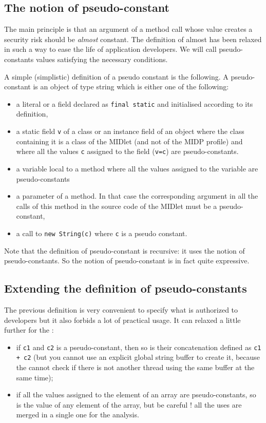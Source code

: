 \subsection{The notion of pseudo-constant}
The main principle is that an argument of a method call whose value creates
a security risk should be \emph{almost} constant. The definition of almost 
has been relaxed in such a way to ease the life of application developers.
We will call pseudo-constants values satisfying the necessary conditions.

A simple (simplistic) definition of a pseudo constant is the following.
A pseudo-constant is an object of type string which is either one of the following:
\begin{itemize}
\item a literal or a field declared as \verb!final static! and initialised according to its definition,
\item a static field \verb!v! of a class or an instance field of an object where the class containing it is a class of the MIDlet (and not of the MIDP profile) and where all the values \verb!c! assigned to the field (\verb!v=c!) are 
pseudo-constants.
\item a variable local to a method where all the values assigned to the 
variable are pseudo-constants
\item a parameter of a method. In that case the corresponding argument in all the calls of this method in the source code of the MIDlet must be a 
pseudo-constant,
\item a call to \verb!new String(c)! where \verb!c! is a pseudo constant.
\end{itemize}
Note that the definition of pseudo-constant is recursive: it uses the notion
of pseudo-constants. So the notion of pseudo-constant is in fact 
quite expressive.

\subsection{Extending the definition of pseudo-constants}
The previous definition is very convenient to specify what is authorized to
developers but it also forbids a lot of practical usage. It can  relaxed
a little further for the \ma:
\begin{itemize}
\item if \verb!c1! and \verb!c2! is a pseudo-constant, then so is their
concatenation defined as \verb!c1 + c2! (but you cannot use an explicit global 
string buffer to create it, because the \ma cannot check if there is not
another thread using the same buffer at the same time);
\item if all the values assigned to the element of an array are pseudo-constants, so is the value of any element of the array, but be careful ! all the uses
are merged in a single one for the analysis.
\end{itemize}

